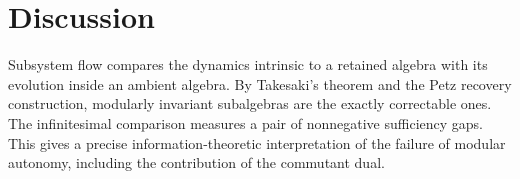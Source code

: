 \documentclass[a4paper,11pt]{article}
\theoremstyle{definition}
\begin{document}


\section{Discussion}\label{sec:discussion}

Subsystem flow compares the dynamics intrinsic to a retained algebra with its evolution inside an ambient algebra. By Takesaki's theorem and the Petz recovery construction, modularly invariant subalgebras are the exactly correctable ones. The infinitesimal comparison measures a pair of nonnegative sufficiency gaps. This gives a precise information-theoretic interpretation of the failure of modular autonomy, including the contribution of the commutant dual.
\end{document}
